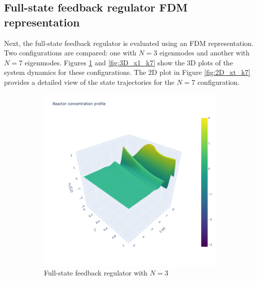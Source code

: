 \subsection{Full-state feedback regulator FDM representation}

Next, the full-state feedback regulator is evaluated using an FDM representation. Two configurations are compared: one with $N=3$ eigenmodes and another with $N=7$ eigenmodes. Figures \ref{fig:3D_x1_k3} and \ref{fig:3D_x1_k7} show the 3D plots of the system dynamics for these configurations. The 2D plot in Figure \ref{fig:2D_xt_k7} provides a detailed view of the state trajectories for the $N=7$ configuration.

\begin{figure}[H]
    \centering
    \begin{subfigure}[b]{0.45\textwidth}
        \includegraphics[width=\textwidth]{Figures/3D_x1_k3.png}
        \caption{Full-state feedback regulator with $N=3$}
        \label{fig:3D_x1_k3}
    \end{subfigure}
    \hfill
    \begin{subfigure}[b]{0.45\textwidth}

\end{subfigure}
\end{figure}
